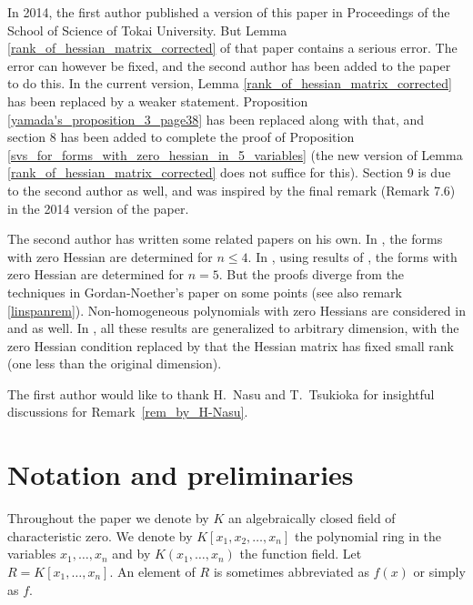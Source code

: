 \documentclass[12pt]{article}
\theoremstyle{definition}
\theoremstyle{remark}
\begin{document}
In 2014, the first author published a version of this paper in 
Proceedings of the School of Science of Tokai University. But Lemma 
\ref{rank_of_hessian_matrix_corrected} of that paper contains a serious error. 
The error can however be fixed, and the second author has been
added to the paper to do this. In the current version, Lemma 
\ref{rank_of_hessian_matrix_corrected} has been replaced by a weaker statement. 
Proposition \ref{yamada's_proposition_3_page38} has been replaced along with 
that, and section 8 has been added to complete the proof of Proposition 
\ref{svs_for_forms_with_zero_hessian_in_5_variables} (the new version of 
Lemma \ref{rank_of_hessian_matrix_corrected} does not suffice for this). 
Section 9 is due to the second author as well, and was inspired by the final 
remark (Remark 7.6) in the 2014 version of the paper.

The second author has written some related papers on his own. 
In \cite{qtnsh}, the forms with zero Hessian are determined for $n \leq 4$.
In \cite{hmgqt5}, using results of \cite{singhess}, the forms with zero 
Hessian are determined for $n = 5$. But the proofs diverge from the techniques
in Gordan-Noether's paper \cite{GNzzz} on some points (see also remark 
\ref{linspanrem}). Non-homogeneous polynomials with zero Hessians are 
considered in \cite{singhess} and \cite{qtnsh} as well. 
In \cite{hessmalrank}, all these results are generalized to arbitrary
dimension, with the zero Hessian condition replaced by that the Hessian 
matrix has fixed small rank (one less than the original dimension). 

The first author would like to thank H.\ Nasu and T.\ Tsukioka for insightful discussions 
for Remark~\ref{rem_by_H-Nasu}.  

\section{Notation and preliminaries}
Throughout the paper we denote by $K$ an algebraically closed field of characteristic zero. We 
denote by 
$K[x_1, x_2, \ldots, x_n]$  the polynomial ring in the variables $x_1, \ldots, x_n$ and by $K(x_1, \ldots, x_n)$ 
 the function field.  
Let $R=K[x_1, \ldots, x_n]$. 
   An element of $R$ is sometimes abbreviated as  $f(x)$
or simply as $f$.  
\end{document}
